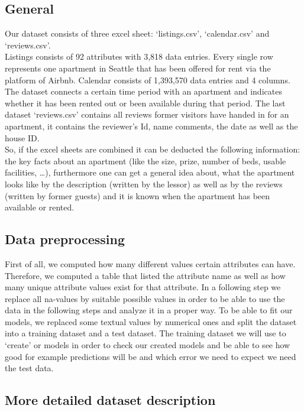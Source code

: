 \documentclass[journal]{IEEEtran}
\begin{document}
\subsection {General}
\noindent Our dataset consists of three excel sheet: ‘listings.csv’, ‘calendar.csv’ and ‘reviews.csv’.\\
Listings consists of 92 attributes with 3,818 data entries. Every single row represents one apartment in Seattle that has been offered for rent via the platform of Airbnb. Calendar consists of 1,393,570 data entries and 4 columns. The dataset connects a certain time period with an apartment and indicates whether it has been rented out or been available during that period. The last dataset ‘reviews.csv’ contains all reviews former visitors have handed in for an apartment, it contains the reviewer’s Id, name comments, the date as well as the house ID.\\So, if the excel sheets are combined it can be deducted the following information: the key facts about an apartment (like the size, prize, number of beds, usable facilities, …), furthermore one can get a general idea about, what the apartment looks like by the description (written by the lessor) as well as by the reviews (written by former guests) and it is known when the apartment has been available or rented.

\subsection {Data preprocessing}
First of all, we computed how many different values certain attributes can have. Therefore, we computed a table that listed the attribute name as well as how many unique attribute values exist for that attribute.
In a following step we replace all na-values by suitable possible values in order to be able to use the data in the following steps and analyze it in a proper way. To be able to fit our models, we replaced some textual values by numerical ones and split the dataset into a training dataset and a test dataset. The training dataset we will use to ‘create’ or models in order to check our created models and be able to see how good for example predictions will be and which error we need to expect we need the test data.

\subsection {More detailed dataset description}
\end{document}
